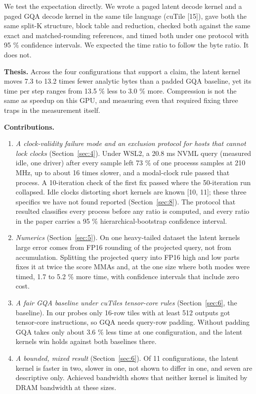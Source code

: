\documentclass[conference]{IEEEtran}
\providecommand{\tightlist}{}
\begin{document}
We test the expectation directly. We wrote a paged latent decode kernel and a paged GQA decode kernel in the same tile language (cuTile {[}15{]}), gave both the same split-K structure, block table and reduction, checked both against the same exact and matched-rounding references, and timed both under one protocol with 95 \% confidence intervals. We expected the time ratio to follow the byte ratio. It does not.

\textbf{Thesis.} Across the four configurations that support a claim, the latent kernel moves 7.3 to 13.2 times fewer analytic bytes than a padded GQA baseline, yet its time per step ranges from 13.5 \% less to 3.0 \% more. Compression is not the same as speedup on this GPU, and measuring even that required fixing three traps in the measurement itself.

\textbf{Contributions.}

\begin{enumerate}
\def\labelenumi{\arabic{enumi}.}
\tightlist
\item
  \emph{A clock-validity failure mode and an exclusion protocol for hosts that cannot lock clocks} (Section~\ref{sec:4}). Under WSL2, a 20.8 ms NVML query (measured idle, one driver) after every sample left 73 \% of one process\textquotesingle s samples at 210 MHz, up to about 16 times slower, and a modal-clock rule passed that process. A 10-iteration check of the first fix passed where the 50-iteration run collapsed. Idle clocks distorting short kernels are known {[}10, 11{]}; these three specifics we have not found reported (Section~\ref{sec:8}). The protocol that resulted classifies every process before any ratio is computed, and every ratio in the paper carries a 95 \% hierarchical-bootstrap confidence interval.
\item
  \emph{Numerics} (Section~\ref{sec:5}). On one heavy-tailed dataset the latent kernel\textquotesingle s large error comes from FP16 rounding of the projected query, not from accumulation. Splitting the projected query into FP16 high and low parts fixes it at twice the score MMAs and, at the one size where both modes were timed, 1.7 to 5.2 \% more time, with confidence intervals that include zero cost.
\item
  \emph{A fair GQA baseline under cuTile\textquotesingle s tensor-core rules} (Section~\ref{sec:6}, the baseline). In our probes only 16-row tiles with at least 512 outputs got tensor-core instructions, so GQA needs query-row padding. Without padding GQA takes only about 3.6 \% less time at one configuration, and the latent kernel\textquotesingle s win holds against both baselines there.
\item
  \emph{A bounded, mixed result} (Section~\ref{sec:6}). Of 11 configurations, the latent kernel is faster in two, slower in one, not shown to differ in one, and seven are descriptive only. Achieved bandwidth shows that neither kernel is limited by DRAM bandwidth at these sizes.
\end{enumerate}
\end{document}
